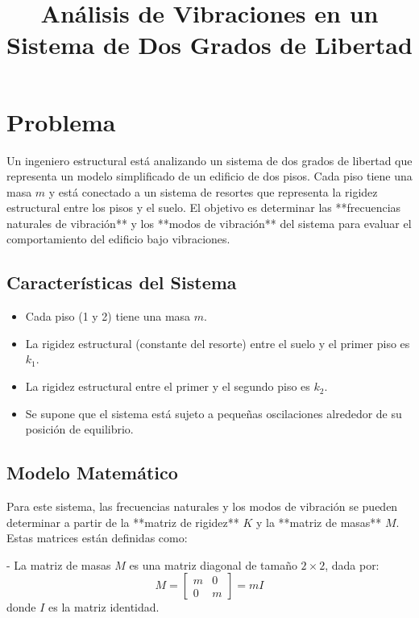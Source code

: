 \documentclass{article}
\begin{document}
\title{Análisis de Vibraciones en un Sistema de Dos Grados de Libertad}
\author{}
\date{}
\maketitle

\section*{Problema}

Un ingeniero estructural está analizando un sistema de dos grados de libertad que representa un modelo simplificado de un edificio de dos pisos. Cada piso tiene una masa \( m \) y está conectado a un sistema de resortes que representa la rigidez estructural entre los pisos y el suelo. El objetivo es determinar las **frecuencias naturales de vibración** y los **modos de vibración** del sistema para evaluar el comportamiento del edificio bajo vibraciones.

\subsection*{Características del Sistema}

\begin{itemize}
    \item Cada piso (1 y 2) tiene una masa \( m \).
    \item La rigidez estructural (constante del resorte) entre el suelo y el primer piso es \( k_1 \).
    \item La rigidez estructural entre el primer y el segundo piso es \( k_2 \).
    \item Se supone que el sistema está sujeto a pequeñas oscilaciones alrededor de su posición de equilibrio.
\end{itemize}

\subsection*{Modelo Matemático}

Para este sistema, las frecuencias naturales y los modos de vibración se pueden determinar a partir de la **matriz de rigidez** \( K \) y la **matriz de masas** \( M \). Estas matrices están definidas como:

- La matriz de masas \( M \) es una matriz diagonal de tamaño \(2 \times 2\), dada por:
  \[
  M = \begin{bmatrix} m & 0 \\ 0 & m \end{bmatrix} = m I
  \]
  donde \( I \) es la matriz identidad.
\end{document}
